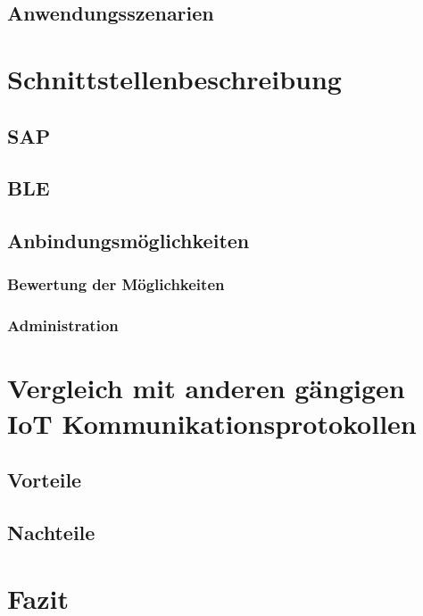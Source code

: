 \subsection{Anwendungsszenarien}
\label{ss:funktionsweise:anwendungen}

\section{Schnittstellenbeschreibung}
\label{s:interface} 

\subsection{SAP}
\label{ss:interface:sap}

\subsection{BLE}
\label{ss:interface:ble}

\subsection{Anbindungsmöglichkeiten}
\label{ss:interface:connect}

\subsubsection{Bewertung der Möglichkeiten}
\label{sss:interface:connect:eval}

\subsubsection{Administration}
\label{sss:interface:connect:admin}

\section{Vergleich mit anderen gängigen IoT Kommunikationsprotokollen}
\label{s:vergleich} 

\subsection{Vorteile}
\label{ss:vergleich:adv}

\subsection{Nachteile}
\label{ss:vergleich:disadv}

\section{Fazit}
\label{s:fazit}

  

